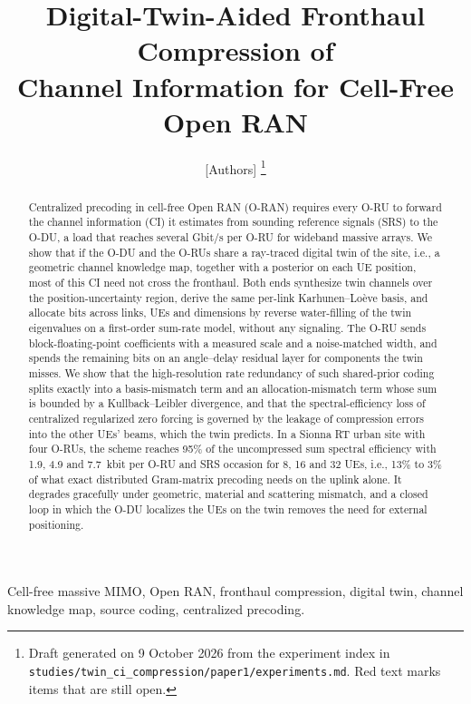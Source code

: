 \documentclass[journal]{IEEEtran}
\begin{document}
\title{Digital-Twin-Aided Fronthaul Compression of\\ Channel Information for Cell-Free Open RAN}
\author{[Authors]%
\thanks{Draft generated on 9 October 2026 from the experiment index in \texttt{studies/twin\_ci\_compression/paper1/experiments.md}. Red text marks items that are still open.}}

\maketitle

\begin{abstract}
Centralized precoding in cell-free Open RAN (O-RAN) requires every O-RU to forward the channel information (CI) it estimates from sounding reference signals (SRS) to the O-DU, a load that reaches several Gbit/s per O-RU for wideband massive arrays. We show that if the O-DU and the O-RUs share a ray-traced digital twin of the site, i.e., a geometric channel knowledge map, together with a posterior on each UE position, most of this CI need not cross the fronthaul. Both ends synthesize twin channels over the position-uncertainty region, derive the same per-link Karhunen--Lo\`eve basis, and allocate bits across links, UEs and dimensions by reverse water-filling of the twin eigenvalues on a first-order sum-rate model, without any signaling. The O-RU sends block-floating-point coefficients with a measured scale and a noise-matched width, and spends the remaining bits on an angle--delay residual layer for components the twin misses. We show that the high-resolution rate redundancy of such shared-prior coding splits exactly into a basis-mismatch term and an allocation-mismatch term whose sum is bounded by a Kullback--Leibler divergence, and that the spectral-efficiency loss of centralized regularized zero forcing is governed by the leakage of compression errors into the other UEs' beams, which the twin predicts. In a Sionna RT urban site with four O-RUs, the scheme reaches 95\% of the uncompressed sum spectral efficiency with 1.9, 4.9 and 7.7~kbit per O-RU and SRS occasion for 8, 16 and 32 UEs, i.e., 13\% to 3\% of what exact distributed Gram-matrix precoding needs on the uplink alone. It degrades gracefully under geometric, material and scattering mismatch, and a closed loop in which the O-DU localizes the UEs on the twin removes the need for external positioning.
\end{abstract}

\begin{IEEEkeywords}
Cell-free massive MIMO, Open RAN, fronthaul compression, digital twin, channel knowledge map, source coding, centralized precoding.
\end{IEEEkeywords}
\end{document}
